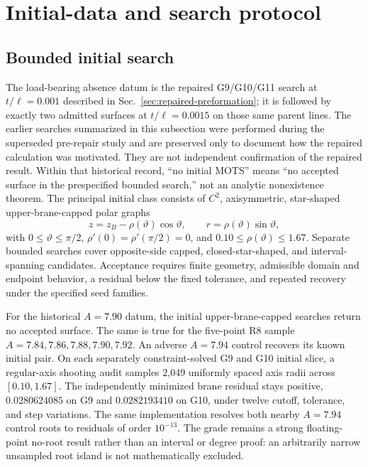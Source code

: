 \documentclass[11pt]{article}
\begin{document}
\section{Initial-data and search protocol}

\subsection{Bounded initial search}

The load-bearing absence datum is the repaired G9/G10/G11 search at
$t/\ell=0.001$ described in Sec.~\ref{sec:repaired-preformation}; it is followed
by exactly two admitted surfaces at $t/\ell=0.0015$ on those same parent lines.
The earlier searches summarized in this subsection were performed during the
superseded pre-repair study and are preserved only to document how the repaired
calculation was motivated.  They are not independent confirmation of the
repaired result.  Within that historical record, ``no initial MOTS'' means
``no accepted surface in the prespecified bounded search,'' not an analytic
nonexistence theorem.
The principal initial class consists of $C^2$, axisymmetric, star-shaped
upper-brane-capped polar graphs
\begin{equation}
z=z_B-\rho(\vartheta)\cos\vartheta,\qquad
r=\rho(\vartheta)\sin\vartheta,
\end{equation}
with $0\leq\vartheta\leq\pi/2$,
$\rho'(0)=\rho'(\pi/2)=0$, and
$0.10\leq\rho(\vartheta)\leq1.67$.  Separate bounded searches cover
opposite-side capped, closed-star-shaped, and interval-spanning candidates.
Acceptance requires finite geometry, admissible domain and endpoint behavior,
a residual below the fixed tolerance, and repeated recovery under the
specified seed families.

For the historical $A=7.90$ datum, the initial upper-brane-capped searches
return no accepted surface.  The same is true for the five-point R8 sample
$A=7.84,7.86,7.88,7.90,7.92$.  An adverse $A=7.94$ control recovers its known
initial pair.  On each separately constraint-solved G9 and G10 initial slice,
a regular-axis shooting audit samples 2,049 uniformly spaced axis radii across
$[0.10,1.67]$.  The independently minimized brane residual stays positive,
$0.0280624085$ on G9 and $0.0282193410$ on G10, under twelve cutoff,
tolerance, and step variations.  The same implementation resolves both nearby
$A=7.94$ control roots to residuals of order $10^{-13}$.  The grade remains a
strong floating-point no-root result rather than an interval or degree proof:
an arbitrarily narrow unsampled root island is not mathematically excluded.
\end{document}
